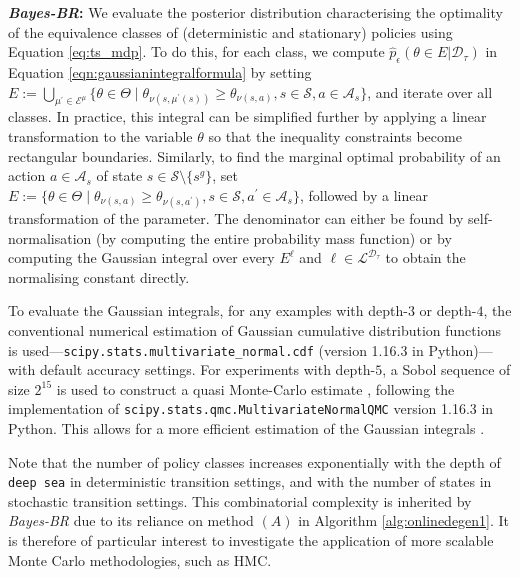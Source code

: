 \documentclass{amsart}
\begin{document}
\textbf{\textit{Bayes-BR}:} 
We evaluate the posterior distribution characterising the optimality of the equivalence classes of (deterministic and stationary) policies using Equation \ref{eq:ts_mdp}. To do this, for each class, we compute $\hat{p}_\epsilon(\theta \in E|\mathcal{D}_{\tau})$ in Equation \ref{eqn:gaussianintegralformula} by setting $E:=\bigcup_{\mu^\prime \in \mathcal{E}^\mu}\{\theta \in \Theta \mid \theta_{\nu(s,\mu^\prime(s))}\geq \theta_{\nu(s,a)}, s\in \mathcal{S}, a \in \mathcal{A}_s\}$, and iterate over all classes. In practice, this integral can be simplified further by applying a linear transformation to the variable $\theta$ so that the inequality constraints become rectangular boundaries. Similarly, to find the marginal optimal probability of an action $a \in \mathcal{A}_s$ of state $s \in \mathcal{S} \setminus \{s^g\}$, set $E:=\{\theta \in \Theta \mid \theta_{\nu(s,a)}\geq \theta_{\nu(s,a^\prime)}, s\in \mathcal{S}, a^\prime \in \mathcal{A}_s\}$, followed by a linear transformation of the parameter. The denominator can either be found by self-normalisation (by computing the entire probability mass function) or by computing the Gaussian integral over every $E^{\ell}$ and $\ell \in \mathcal{L}^{\mathcal{D}_\tau}$ to obtain the normalising constant directly.

\begin{sloppypar}
To evaluate the Gaussian integrals, for any examples with depth-$3$ or depth-$4$, the conventional numerical estimation of Gaussian cumulative distribution functions is used---\texttt{scipy.stats.multivariate\_normal.cdf} (version 1.16.3 in Python)---with default accuracy settings. For experiments with depth-$5$, a Sobol sequence of size $2^{15}$ is used to construct a quasi Monte-Carlo estimate \citep{qmc_caflisch_1998}, following the implementation of \texttt{scipy.stats.qmc.MultivariateNormalQMC} version 1.16.3 in Python. This allows for a more efficient estimation of the Gaussian integrals \citep{scipy}.
\end{sloppypar}

Note that the number of policy classes increases exponentially with the depth of \texttt{deep sea} in deterministic transition settings, and with the number of states in stochastic transition settings. This combinatorial complexity is inherited by \textit{Bayes-BR} due to its reliance on method $(A)$ in Algorithm \ref{alg:onlinedegen1}. It is therefore of particular interest to investigate the application of more scalable Monte Carlo methodologies, such as HMC.
\end{document}
